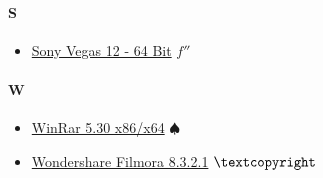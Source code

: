 	\paragraph{S} \hypertarget{US}{}
		\begin{itemize}
			\item \href{https://mega.nz/#!ua40jKCZ!US36FScjig7jnISiMfzRl-6mOH7KARV39ebLgsSh3p4} {Sony Vegas 12 - 64 Bit} $f''$ \\	
			
		\end{itemize}

	\paragraph{W} \hypertarget{UW}{}
		\begin{itemize}
			\item \href{https://mega.nz/#!7OZgGIaS!0BaymFQaJQBuEczHpXeVFbK-FwuZrxcdLnPggEqK9i8} {WinRar 5.30 x86/x64} $\spadesuit$ \\		
			\item \href{https://mega.nz/#!TDxnVBjb!bQYlnRVemaQOy02qNWG7m7HIENNhzYJtL8iresNKeUc} {Wondershare Filmora 8.3.2.1} $\textcopyright$ \\	
			
		\end{itemize}